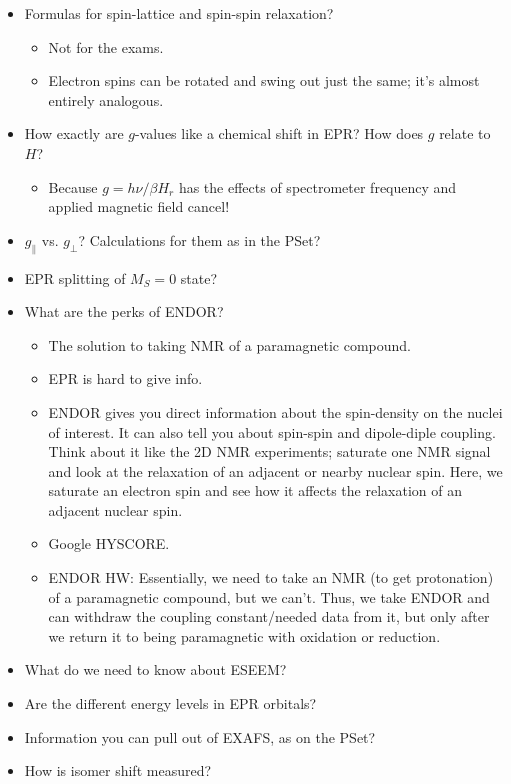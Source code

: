 \documentclass[../notes.tex]{subfiles}
\begin{document}
\begin{itemize}
    \item Formulas for spin-lattice and spin-spin relaxation?
    \begin{itemize}
        \item Not for the exams.
        \item Electron spins can be rotated and swing out just the same; it's almost entirely analogous.
    \end{itemize}
    \item How exactly are $g$-values like a chemical shift in EPR? How does $g$ relate to $H$?
    \begin{itemize}
        \item Because $g=h\nu/\beta H_r$ has the effects of spectrometer frequency and applied magnetic field cancel!
    \end{itemize}
    \item $g_\parallel$ vs. $g_\perp$? Calculations for them as in the PSet?
    \item EPR splitting of $M_S=0$ state?
    \item What are the perks of ENDOR?
    \begin{itemize}
        \item The solution to taking NMR of a paramagnetic compound.
        \item EPR is hard to give info.
        \item ENDOR gives you direct information about the spin-density on the nuclei of interest. It can also tell you about spin-spin and dipole-diple coupling. Think about it like the 2D NMR experiments; saturate one NMR signal and look at the relaxation of an adjacent or nearby nuclear spin. Here, we saturate an electron spin and see how it affects the relaxation of an adjacent nuclear spin.
        \item Google HYSCORE.
        \item ENDOR HW: Essentially, we need to take an NMR (to get protonation) of a paramagnetic compound, but we can't. Thus, we take ENDOR and can withdraw the coupling constant/needed data from it, but only after we return it to being paramagnetic with oxidation or reduction.
    \end{itemize}
    \item What do we need to know about ESEEM?
    \item Are the different energy levels in EPR orbitals?
    \item Information you can pull out of EXAFS, as on the PSet?
    \item How is isomer shift measured?

\end{itemize}
\end{document}

